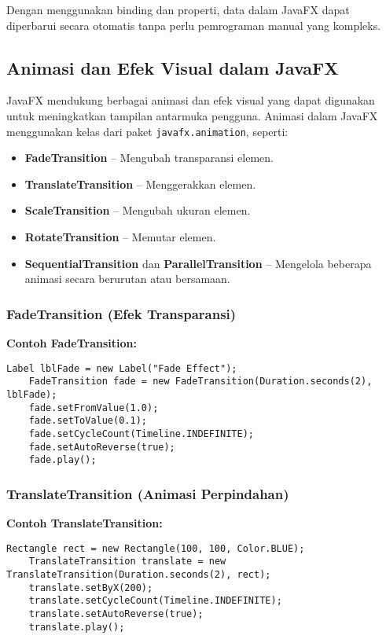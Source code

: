 Dengan menggunakan binding dan properti, data dalam JavaFX dapat diperbarui secara otomatis tanpa perlu pemrograman manual yang kompleks.

\subsection{Animasi dan Efek Visual dalam JavaFX}

JavaFX mendukung berbagai animasi dan efek visual yang dapat digunakan untuk meningkatkan tampilan antarmuka pengguna. Animasi dalam JavaFX menggunakan kelas dari paket \texttt{javafx.animation}, seperti:

\begin{itemize}
	\item \textbf{FadeTransition} – Mengubah transparansi elemen.
	\item \textbf{TranslateTransition} – Menggerakkan elemen.
	\item \textbf{ScaleTransition} – Mengubah ukuran elemen.
	\item \textbf{RotateTransition} – Memutar elemen.
	\item \textbf{SequentialTransition} dan \textbf{ParallelTransition} – Mengelola beberapa animasi secara berurutan atau bersamaan.
\end{itemize}

\subsubsection{FadeTransition (Efek Transparansi)}

\textbf{Contoh FadeTransition:}
\begin{lstlisting}[style=JavaStyle, caption=Mengubah transparansi elemen]
	Label lblFade = new Label("Fade Effect");
	FadeTransition fade = new FadeTransition(Duration.seconds(2), lblFade);
	fade.setFromValue(1.0);
	fade.setToValue(0.1);
	fade.setCycleCount(Timeline.INDEFINITE);
	fade.setAutoReverse(true);
	fade.play();
\end{lstlisting}

\subsubsection{TranslateTransition (Animasi Perpindahan)}

\textbf{Contoh TranslateTransition:}
\begin{lstlisting}[style=JavaStyle, caption=Menggerakkan objek dalam JavaFX]
	Rectangle rect = new Rectangle(100, 100, Color.BLUE);
	TranslateTransition translate = new TranslateTransition(Duration.seconds(2), rect);
	translate.setByX(200);
	translate.setCycleCount(Timeline.INDEFINITE);
	translate.setAutoReverse(true);
	translate.play();
\end{lstlisting}

